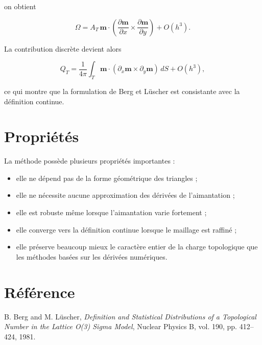 \documentclass[11pt,a4paper]{article}
\begin{document}
on obtient

\[
\Omega
=
A_T\,
\mathbf{m}\cdot
\left(
\frac{\partial\mathbf{m}}{\partial x}
\times
\frac{\partial\mathbf{m}}{\partial y}
\right)
+O(h^3).
\]

La contribution discrète devient alors

\[
Q_T
=
\frac{1}{4\pi}
\int_T
\mathbf{m}\cdot
\left(
\partial_x\mathbf{m}
\times
\partial_y\mathbf{m}
\right)
\,dS
+O(h^3),
\]

ce qui montre que la formulation de Berg et Lüscher est consistante avec la
définition continue.

\section{Propriétés}

La méthode possède plusieurs propriétés importantes :

\begin{itemize}
\item elle ne dépend pas de la forme géométrique des triangles ;
\item elle ne nécessite aucune approximation des dérivées de
l'aimantation ;
\item elle est robuste même lorsque l'aimantation varie fortement ;
\item elle converge vers la définition continue lorsque le maillage est
raffiné ;
\item elle préserve beaucoup mieux le caractère entier de la charge
topologique que les méthodes basées sur les dérivées numériques.
\end{itemize}

\section*{Référence}

B. Berg and M. Lüscher,
\emph{Definition and Statistical Distributions of a Topological Number in the
Lattice O(3) Sigma Model},
Nuclear Physics B, vol. 190, pp. 412--424, 1981.
\end{document}
